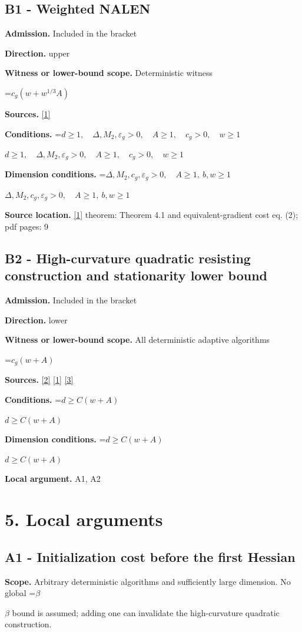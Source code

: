 \documentclass[10pt,a4paper]{article}
\newcommand{\AtlasMath}[1]{\par\begingroup\centering\setbox0=\hbox{$\displaystyle #1$}\ifdim\wd0>1.4\linewidth\typeout{ATLAS WIDE FORMULA: \the\wd0}\fi\ifdim\wd0>\linewidth\resizebox{\linewidth}{!}{\box0}\else\box0\fi\par\endgroup}
\newcommand{\AtlasInlineMath}[1]{\begingroup\setbox0=\hbox{$#1$}\ifdim\wd0>.4\linewidth\endgroup\AtlasMath{#1}\else\endgroup$#1$\fi}
\begin{document}
\subsection{B1 - Weighted NALEN}
\textbf{Admission.} Included in the bracket

\textbf{Direction.} upper

\textbf{Witness or lower-bound scope.} Deterministic witness

\AtlasMath{c_g(w+w^{1/3}A)}
\textbf{Sources.} \href{https://arxiv.org/abs/2501.17488v3}{[1]}

\textbf{Conditions.} \AtlasInlineMath{d\ge1,\quad\Delta,M_2,\varepsilon_g>0,\quad A\ge1,\quad c_g>0,\quad w\ge1}

\textbf{Dimension conditions.} \AtlasInlineMath{\Delta,M_2,c_g,\varepsilon_g>0,\quad A\ge1,\ b,w\ge1}

\textbf{Source location.} \href{https://arxiv.org/abs/2501.17488v3}{[1]} theorem: Theorem 4.1 and equivalent-gradient cost eq. (2); pdf pages: 9

\subsection{B2 - High-curvature quadratic resisting construction and stationarity lower bound}
\textbf{Admission.} Included in the bracket

\textbf{Direction.} lower

\textbf{Witness or lower-bound scope.} All deterministic adaptive algorithms

\AtlasMath{c_g(w+A)}
\textbf{Sources.} \href{https://arxiv.org/abs/1710.11606v3}{[2]} \href{https://arxiv.org/abs/2501.17488v3}{[1]} \href{https://arxiv.org/abs/2610.03222v1}{[3]}

\textbf{Conditions.} \AtlasInlineMath{d\ge C(w+A)}

\textbf{Dimension conditions.} \AtlasInlineMath{d\ge C(w+A)}

\textbf{Local argument.} A1, A2

\section{5. Local arguments}
\subsection{A1 - Initialization cost before the first Hessian}
\textbf{Scope.} Arbitrary deterministic algorithms and sufficiently large dimension. No global \AtlasInlineMath{\beta} bound is assumed; adding one can invalidate the high-curvature quadratic construction.
\end{document}
